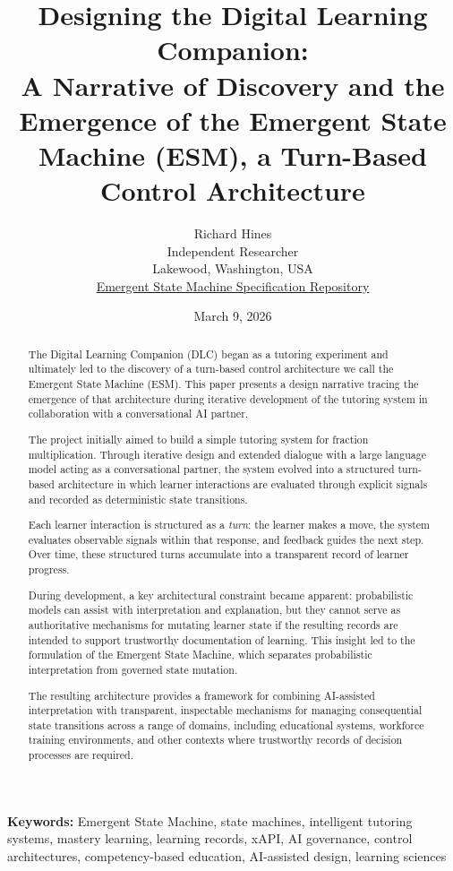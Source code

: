 \documentclass[11pt]{article}
\title{Designing the Digital Learning Companion:\\
A Narrative of Discovery and the Emergence of the Emergent State Machine (ESM), a Turn-Based Control Architecture}
\author{
Richard Hines \\
Independent Researcher \\
Lakewood, Washington, USA \\
\href{https://github.com/emergent-state-machine/esm-spec}{Emergent State Machine Specification Repository}
}
\date{March 9, 2026}
\begin{document}
\maketitle

\begin{abstract}

The Digital Learning Companion (DLC) began as a tutoring experiment and ultimately led to the discovery of a turn-based control architecture we call the Emergent State Machine (ESM). This paper presents a design narrative tracing the emergence of that architecture during iterative development of the tutoring system in collaboration with a conversational AI partner.

The project initially aimed to build a simple tutoring system for fraction multiplication. Through iterative design and extended dialogue with a large language model acting as a conversational partner, the system evolved into a structured turn-based architecture in which learner interactions are evaluated through explicit signals and recorded as deterministic state transitions.

Each learner interaction is structured as a \emph{turn}: the learner makes a move, the system evaluates observable signals within that response, and feedback guides the next step. Over time, these structured turns accumulate into a transparent record of learner progress.

During development, a key architectural constraint became apparent: probabilistic models can assist with interpretation and explanation, but they cannot serve as authoritative mechanisms for mutating learner state if the resulting records are intended to support trustworthy documentation of learning. This insight led to the formulation of the Emergent State Machine, which separates probabilistic interpretation from governed state mutation.

The resulting architecture provides a framework for combining AI-assisted interpretation with transparent, inspectable mechanisms for managing consequential state transitions across a range of domains, including educational systems, workforce training environments, and other contexts where trustworthy records of decision processes are required.

\end{abstract}

\vspace{0.8em}

\noindent\textbf{Keywords:} Emergent State Machine, state machines, intelligent tutoring systems, mastery learning, learning records, xAPI, AI governance, control architectures, competency-based education, AI-assisted design, learning sciences
\end{document}
